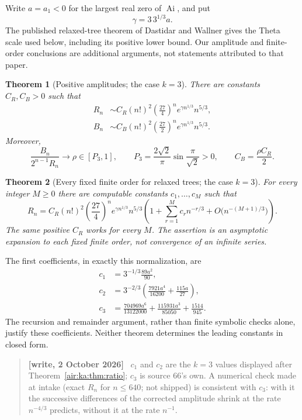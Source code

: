 \documentclass[11pt,letterpaper]{article}
\numberwithin{equation}{section}
\newtheorem{theorem}{Theorem}[section]
\theoremstyle{remark}
\newcommand{\Ai}{\operatorname{Ai}}
\newenvironment{writenote}{\par\smallskip\begin{quote}\small\textbf{[write, 2 October 2026]}\ }{\end{quote}\smallskip}
\begin{document}
Write $a=a_1<0$ for the largest real zero of $\Ai$, and put
\[
\gamma=3\,3^{1/3}a.
\]
The published relaxed-tree theorem of Dastidar and Wallner \cite{gdw} gives the Theta scale used below, including its positive lower bound. Our amplitude and finite-order conclusions are additional arguments, not statements attributed to that paper.

\begin{theorem}[Positive amplitudes; the case $k=3$]\label{air:t3:thm:main}
There are constants $C_R,C_B>0$ such that
\begin{align}
R_n&\sim C_R(n!)^2\left(\frac{27}{4}\right)^n
 e^{\gamma n^{1/3}}n^{5/3},\label{air:t3:eq:Rmain}\\
B_n&\sim C_B(n!)^2\left(\frac{27}{2}\right)^n
 e^{\gamma n^{1/3}}n^{5/3}.\label{air:t3:eq:Bmain}
\end{align}
Moreover,
\[
\frac{B_n}{2^{n-1}R_n}\longrightarrow\rho\in[P_3,1],\qquad
P_3=\frac{2\sqrt2}{\pi}\sin\frac{\pi}{\sqrt2}>0,
\qquad C_B=\frac{\rho C_R}{2}.
\]
\end{theorem}

\begin{theorem}[Every fixed finite order for relaxed trees; the case $k=3$]\label{air:t3:thm:orders}
For every integer $M\ge0$ there are computable constants $c_1,\ldots,c_M$ such that
\[
R_n=C_R(n!)^2\left(\frac{27}{4}\right)^n e^{\gamma n^{1/3}}n^{5/3}
\left(1+\sum_{r=1}^{M}c_rn^{-r/3}+O\bigl(n^{-(M+1)/3}\bigr)\right).
\]
The same positive $C_R$ works for every $M$. The assertion is an asymptotic expansion to each fixed finite order, not convergence of an infinite series.
\end{theorem}

The first coefficients, in exactly this normalization, are
\begin{align*}
c_1&=3^{-1/3}\frac{89a^2}{90},\\
c_2&=3^{-2/3}\left(\frac{7921a^4}{16200}+\frac{115a}{27}\right),\\
c_3&=\frac{704969a^6}{13122000}+\frac{115931a^3}{85050}
       +\frac{1514}{945}.
\end{align*}
The recursion and remainder argument, rather than finite symbolic checks alone, justify these coefficients. Neither theorem determines the leading constants in closed form.
\begin{writenote}
$c_1$ and $c_2$ are the $k=3$ values displayed after Theorem~\ref{air:ka:thm:ratio}; $c_3$ is source 66's own. A numerical check made at intake (exact $R_n$ for $n\le640$; not shipped) is consistent with $c_3$: with it the successive differences of the corrected amplitude shrink at the rate $n^{-4/3}$ predicts, without it at the rate $n^{-1}$.
\end{writenote}
\end{document}
